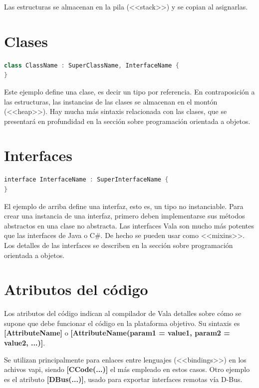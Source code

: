 \documentclass[12pt,twoside]{book}
\begin{document}
Las estructuras se almacenan en la pila (<<stack>>) y se copian al asignarlas.

\section{Clases}

\begin{lstlisting}[language=C++]
class ClassName : SuperClassName, InterfaceName {
}
\end{lstlisting}

Este ejemplo define una clase, es decir un tipo por referencia. En contraposición a las estructuras, las instancias de las clases se almacenan en el montón (<<heap>>). Hay mucha más sintaxis relacionada con las clases, que se presentará en profundidad en la sección sobre programación orientada a objetos.

\section{Interfaces}

\begin{lstlisting}[language=C++]
interface InterfaceName : SuperInterfaceName {
}
\end{lstlisting}


El ejemplo de arriba define una interfaz, esto es, un tipo no instanciable. Para crear una instancia de una interfaz, primero deben implementarse sus métodos abstractos en una clase no abstracta. Las interfaces Vala son mucho más potentes que las interfaces de Java o C\#. De hecho se pueden usar como <<mixins>>. Los detalles de las interfaces se describen en la sección sobre programación orientada a objetos.

\section{Atributos del código}

Los atributos del código indican al compilador de Vala detalles sobre cómo se supone que debe funcionar el código en la plataforma objetivo. Su sintaxis es \textbf{[AttributeName]} o \textbf{[AttributeName(param1 = value1, param2 = value2, ...)]}.

Se utilizan principalmente para enlaces entre lenguajes (<<bindings>>) en los achivos vapi, siendo \textbf{[CCode(...)]} el más empleado en estos casos. Otro ejemplo es el atributo \textbf{[DBus(...)]}, usado para exportar interfaces remotas vía D-Bus.
\end{document}
